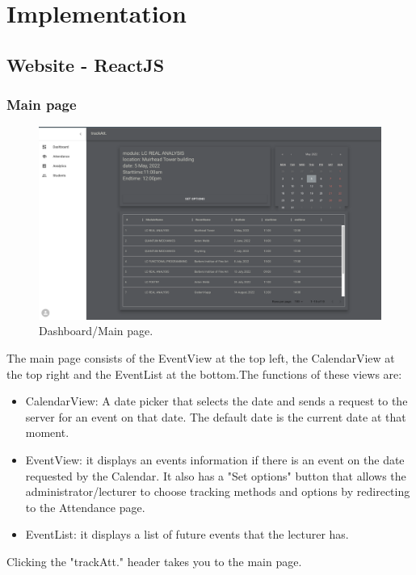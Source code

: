 \section{Implementation}

\subsection{Website - ReactJS}

\subsubsection{Main page}
\begin{figure}[ht!]
  \includegraphics[scale=0.135]{Design & Implementation/images/Dashboard.png}
  \caption{Dashboard/Main page.}
\end{figure}
The main page consists of the EventView at the top left, the CalendarView at the top right and the EventList at the bottom.The functions of these views are:
\begin{itemize}
  \item CalendarView: A date picker that selects the date and sends a request to the server for an event on that date. The default date is the current date at that moment.
  \item EventView: it displays an events information if there is an event on the date requested by the Calendar. It also has a "Set options" button that allows the administrator/lecturer to choose tracking methods and options by redirecting to the Attendance page. 
  \item EventList: it displays a list of future events that the lecturer has.
\end{itemize}
Clicking the "trackAtt." header takes you to the main page.
